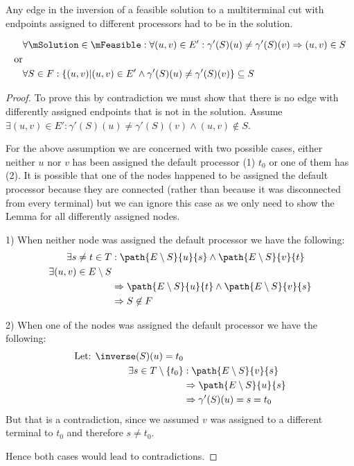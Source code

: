 \begin{lemma}
\label{INVERSESUBSET}
Any edge in the inversion of a feasible solution to a multiterminal cut with endpoints assigned to different processors had to be in the solution.

\begin{align}
	\nonumber & \forall \mSolution \in \mFeasible : \forall (u, v) \in E' : \gamma'(S)(u) \neq \gamma'(S)(v) \Rightarrow (u,v) \in S \\
	\nonumber \mbox{or} &\\
	\nonumber & \forall S \in F : \{(u,v) |(u, v) \in E' \wedge \gamma'(S)(u) \neq \gamma'(S)(v)\} \subseteq S
\end{align}
\end{lemma}
\begin{proof}
To prove this by contradiction we must show that there is no edge with differently assigned endpoints that is not in the solution.
Assume $\exists (u,v) \in E' : \gamma'(S)(u) \neq \gamma'(S)(v) \wedge (u,v) \not\in S$.

For the above assumption we are concerned with two possible cases, either neither $u$ nor $v$ has been assigned the default processor (1) $t_0$ or one of them has (2).
It is possible that one of the nodes happened to be assigned the default processor because they are connected (rather than because it was disconnected from every terminal) but we can ignore this case as we only need to show the Lemma for all differently assigned nodes.

1) When neither node was assigned the default processor we have the following:
\begin{align}
	\nonumber \exists s \neq t \in T  & : \path{E \setminus S}{u}{s} \wedge \path{E \setminus S}{v}{t} \\
	\nonumber \exists (u, v) \in E \setminus S& \\
	\nonumber & \Rightarrow \path{E \setminus S}{u}{t} \wedge \path{E \setminus S}{v}{s} \\
	\nonumber & \Rightarrow S \not\in F
\end{align}

2) When one of the nodes was assigned the default processor we have the following:
\begin{align}
	\nonumber \mbox{Let: } \inverse(S)(u) = t_0 & \\
	\nonumber \exists s \in T \setminus \{t_0\} & : \path{E \setminus S}{v}{s} \\
	\nonumber & \Rightarrow \path{E \setminus S}{u}{s} \\
	\nonumber & \Rightarrow \gamma'(S)(u) = s = t_0
\end{align}
But that is a contradiction, since we assumed $v$ was assigned to a different terminal to $t_0$ and therefore $s \neq t_0$.

Hence both cases would lead to contradictions.
\end{proof}

